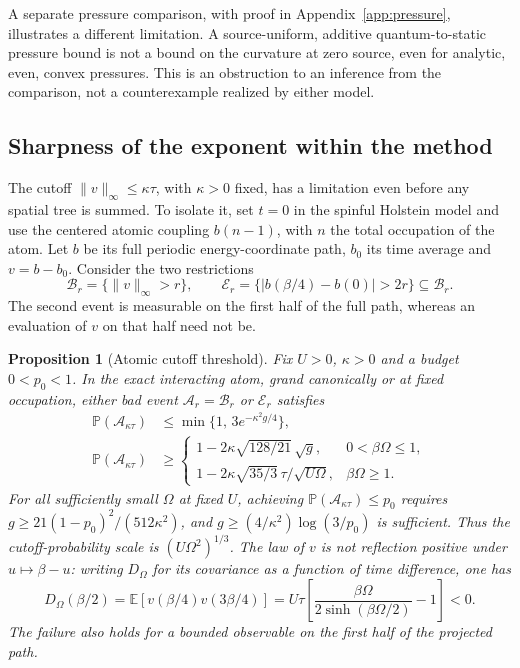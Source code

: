 \documentclass[11pt]{article}
\newtheorem{proposition}{Proposition}
\begin{document}
A separate pressure comparison, with proof in Appendix~\ref{app:pressure}, illustrates a different limitation. A source-uniform, additive quantum-to-static pressure bound is not a bound on the curvature at zero source, even for analytic, even, convex pressures. This is an obstruction to an inference from the comparison, not a counterexample realized by either model.

\subsection{Sharpness of the exponent within the method}
The cutoff $\|v\|_\infty\le\kappa\tau$, with $\kappa>0$ fixed, has a limitation even before any spatial tree is summed. To isolate it, set $t=0$ in the spinful Holstein model and use the centered atomic coupling $b(n-1)$, with $n$ the total occupation of the atom. Let $b$ be its full periodic energy-coordinate path, $b_0$ its time average and $v=b-b_0$. Consider the two restrictions
\[
 \mathcal B_r=\{\|v\|_\infty>r\},\qquad
 \mathcal E_r=\{|b(\beta/4)-b(0)|>2r\}\subseteq\mathcal B_r.
\]
The second event is measurable on the first half of the full path, whereas an evaluation of $v$ on that half need not be.

\begin{proposition}[Atomic cutoff threshold]\label{prop:sharpness}
Fix $U>0$, $\kappa>0$ and a budget $0<p_0<1$. In the exact interacting atom, grand canonically or at fixed occupation, either bad event $\mathcal A_r=\mathcal B_r$ or $\mathcal E_r$ satisfies
\begin{equation}\label{eq:atomic-probability-bounds}
\begin{aligned}
 \mathbb P(\mathcal A_{\kappa\tau})&\le\min\{1,\,3e^{-\kappa^2g/4}\},\\
 \mathbb P(\mathcal A_{\kappa\tau})&\ge
 \begin{cases}
  1-2\kappa\sqrt{128/21}\,\sqrt g, & 0<\beta\Omega\le1,\\
  1-2\kappa\sqrt{35/3}\,\tau/\sqrt{U\Omega}, & \beta\Omega\ge1 .
 \end{cases}
\end{aligned}
\end{equation}
For all sufficiently small $\Omega$ at fixed $U$, achieving $\mathbb P(\mathcal A_{\kappa\tau})\le p_0$ requires $g\ge21(1-p_0)^2/(512\kappa^2)$, and $g\ge(4/\kappa^2)\log(3/p_0)$ is sufficient. Thus the cutoff-probability scale is $(U\Omega^2)^{1/3}$. The law of $v$ is not reflection positive under $u\mapsto\beta-u$: writing $D_\Omega$ for its covariance as a function of time difference, one has
\begin{equation}\label{eq:projected-rp}
 D_\Omega(\beta/2)=\mathbb E[v(\beta/4)v(3\beta/4)]
 = U\tau\left[\frac{\beta\Omega}{2\sinh(\beta\Omega/2)}-1\right]<0 .
\end{equation}
The failure also holds for a bounded observable on the first half of the projected path.
\end{proposition}
\end{document}
